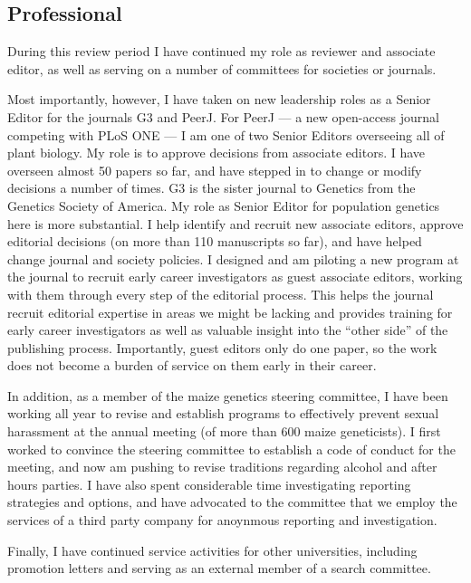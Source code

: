 \documentclass[letterpaper,10pt]{article}
\begin{document}
\subsection*{Professional}

During this review period I have continued my role as reviewer and associate editor, as well as serving on a number of committees for societies or journals.

Most importantly, however, I have taken on new leadership roles as a Senior Editor for the journals G3 and PeerJ.
For PeerJ --- a new open-access journal competing with PLoS ONE --- I am one of two Senior Editors overseeing all of plant biology.
My role is to approve decisions from associate editors.  I have overseen almost 50 papers so far, and have stepped in to change or modify decisions a number of times.
G3 is the sister journal to Genetics from the Genetics Society of America. My role as Senior Editor for population genetics here is more substantial. I help identify and recruit new associate editors, approve editorial decisions (on more than 110 manuscripts so far), and have helped change journal and society policies. I designed and am piloting a new program at the journal to recruit early career investigators as guest associate editors, working with them through every step of the editorial process. This helps the journal recruit editorial expertise in areas we might be lacking and provides training for early career investigators as well as valuable insight into the ``other side'' of the publishing process. Importantly, guest editors only do one paper, so the work does not become a burden of service on them early in their career.

In addition, as a member of the maize genetics steering committee, I have been working all year to revise and establish programs to effectively prevent sexual harassment at the annual meeting (of more than 600 maize geneticists). I first worked to convince the steering committee to establish a code of conduct for the meeting, and now am pushing to revise traditions regarding alcohol and after hours parties. I have also spent considerable time investigating reporting strategies and options, and have advocated to the committee that we employ the services of a third party company for anoynmous reporting and investigation.

Finally, I have continued service activities for other universities, including promotion letters and serving as an external member of a search committee.



\end{document}
